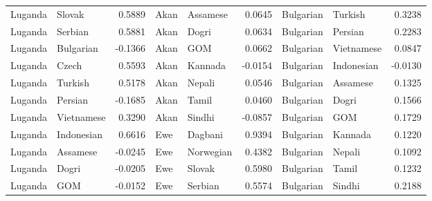 \documentclass[11pt]{article} %
\begin{document}
\begin{table}
\begin{tabular}{llr@{\hspace{12pt}}llr@{\hspace{12pt}}llr}
            Luganda                      & Slovak              & 0.5889        & Akan                & Assamese            & 0.0645        & Bulgarian           & Turkish             & 0.3238        \\
            Luganda                      & Serbian             & 0.5881        & Akan                & Dogri               & 0.0634        & Bulgarian           & Persian             & 0.2283        \\
            Luganda                      & Bulgarian           & -0.1366       & Akan                & GOM                 & 0.0662        & Bulgarian           & Vietnamese          & 0.0847        \\
            Luganda                      & Czech               & 0.5593        & Akan                & Kannada             & -0.0154       & Bulgarian           & Indonesian          & -0.0130       \\
            Luganda                      & Turkish             & 0.5178        & Akan                & Nepali              & 0.0546        & Bulgarian           & Assamese            & 0.1325        \\
            Luganda                      & Persian             & -0.1685       & Akan                & Tamil               & 0.0460        & Bulgarian           & Dogri               & 0.1566        \\
            Luganda                      & Vietnamese          & 0.3290        & Akan                & Sindhi              & -0.0857       & Bulgarian           & GOM                 & 0.1729        \\
            Luganda                      & Indonesian          & 0.6616        & Ewe                 & Dagbani             & 0.9394        & Bulgarian           & Kannada             & 0.1220        \\
            Luganda                      & Assamese            & -0.0245       & Ewe                 & Norwegian           & 0.4382        & Bulgarian           & Nepali              & 0.1092        \\
            Luganda                      & Dogri               & -0.0205       & Ewe                 & Slovak              & 0.5980        & Bulgarian           & Tamil               & 0.1232        \\
            Luganda                      & GOM                 & -0.0152       & Ewe                 & Serbian             & 0.5574        & Bulgarian           & Sindhi              & 0.2188        \\

\end{tabular}
\end{table}
\end{document}
